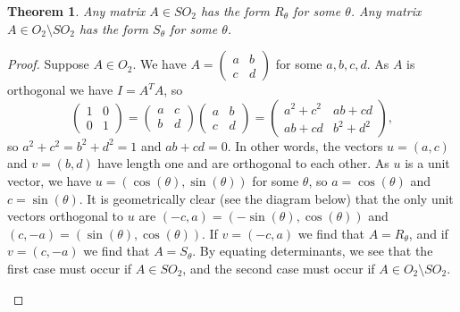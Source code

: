 \documentclass{amsart}
\newcommand{\bsm}       {\left(\begin{smallmatrix}}
\newcommand{\esm}       {\end{smallmatrix}\right)}
\newcommand{\blm}       {\left(\begin{array}{cc}}
\newcommand{\elm}       {\end{array}\right)}
\newcommand{\sm}        {\setminus}
\newcommand{\blob}      {circle(0.03cm)}
\renewcommand{\:}{\colon}
\newtheorem{theorem}{Theorem}[section]
\theoremstyle{definition}
\begin{document}
\begin{theorem}
 Any matrix $A\in SO_2$ has the form $R_\theta$ for some $\theta$.  Any
 matrix $A\in O_2\sm SO_2$ has the form $S_\theta$ for some $\theta$.
\end{theorem}
\begin{proof}
 Suppose $A\in O_2$.  We have $A=\bsm a&b\\c&d\esm$ for some
 $a,b,c,d$.  As $A$ is orthogonal we have $I=A^TA$, so
 \[ \blm 1&0\\0&1\elm = \blm a&c\\ b&d\elm\blm a&b\\c&d\elm =
    \blm a^2 + c^2 & ab + cd \\ ab + cd & b^2 + d^2 \elm,
 \]
 so $a^2+c^2=b^2+d^2=1$ and $ab+cd=0$.  In other words, the vectors
 $u=(a,c)$ and $v=(b,d)$ have length one and are orthogonal to each
 other.  As $u$ is a unit vector, we have $u=(\cos(\theta),\sin(\theta))$
 for some $\theta$, so $a=\cos(\theta)$ and $c=\sin(\theta)$.  It is
 geometrically clear (see the diagram below) that the only unit
 vectors orthogonal to $u$ are $(-c,a)=(-\sin(\theta),\cos(\theta))$ and
 $(c,-a)=(\sin(\theta),\cos(\theta))$.  If $v=(-c,a)$ we find that
 $A=R_\theta$, and if $v=(c,-a)$ we find that $A=S_\theta$.  By equating
 determinants, we see that the first case must occur if $A\in SO_2$,
 and the second case must occur if $A\in O_2\sm SO_2$.
 \begin{center}
 \end{center}
\end{proof}
\end{document}
